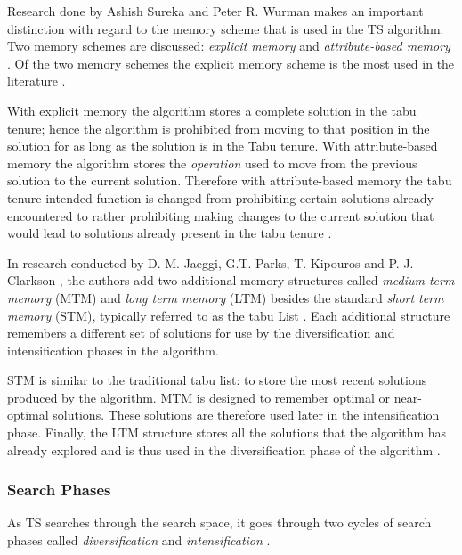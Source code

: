 Research done by Ashish Sureka and Peter R. Wurman makes an important distinction with regard to the memory scheme that is used in the TS algorithm. Two memory schemes are discussed: \emph{explicit memory} and \emph{attribute-based memory} \cite{TabuBiddingStrats,TabuFormGames}. Of the two memory schemes the explicit memory scheme is the most used in the literature \cite{TabuVechicleRoutingWithTimeWindows}.

With explicit memory the algorithm stores a complete solution in the tabu tenure; hence the algorithm is prohibited from moving to that position in the solution for as long as the solution is in the Tabu tenure\cite{TabuBiddingStrats,TabuFormGames}. With attribute-based memory the algorithm stores the \emph{operation} used to move from the previous solution to the current solution\cite{TabuBiddingStrats,TabuFormGames}. Therefore with attribute-based memory the tabu tenure intended function is changed from prohibiting certain solutions already encountered to rather prohibiting making changes to the current solution that would lead to solutions already present in the tabu tenure \cite{TabuBiddingStrats,TabuFormGames}.

In research conducted by D. M. Jaeggi, G.T. Parks, T. Kipouros and P. J. Clarkson \cite{MultiObjTabu}, the authors add two additional memory structures called \emph{medium term memory} (MTM) and \emph{long term memory} (LTM) besides the standard \emph{short term memory} (STM), typically referred to as the tabu List \cite{MultiObjTabu}. Each additional structure remembers a different set of solutions for use by the diversification and intensification phases in the algorithm.

STM is similar to the traditional tabu list: to store the most recent solutions produced by the algorithm. MTM is designed to remember optimal or near-optimal solutions. These solutions are therefore used later in the intensification phase. Finally, the LTM structure stores all the solutions that the algorithm has already explored and is thus used in the diversification phase of the algorithm \cite{MultiObjTabu}.

\subsubsection{Search Phases}
\label{TSSearchPhases}
As TS searches through the search space, it goes through two cycles of search phases called \emph{diversification} and \emph{intensification} \cite{TabuParameterization,TabuCrewSchedulingProblem,NonlinearGlobalTabu,SelfControllingReactiveTabu}.


